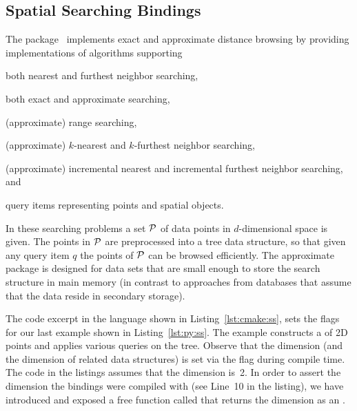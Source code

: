 \subsection{Spatial Searching Bindings}
\label{ssec:modules:ss}
The \dDSpatialSearchingPackage{} package~\cite{cgal:tf-ssd-21a}
implements exact and approximate distance browsing by providing
implementations of algorithms supporting
\begin{compactenum}
\item both nearest and furthest neighbor searching,
\item both exact and approximate searching,
\item (approximate) range searching,
\item (approximate) $k$-nearest and $k$-furthest neighbor searching,
\item (approximate) incremental nearest and incremental furthest neighbor searching, and
\item query items representing points and spatial objects.
\end{compactenum}
In these searching problems a set ${\cal P}$ of data points in
$d$-dimensional space is given. The points in ${\cal P}$ are preprocessed
into a tree data structure, so that given any query item $q$ the
points of ${\cal P}$ can be browsed efficiently. The approximate
\dDSpatialSearchingPackage{} package is designed for data sets that
are small enough to store the search structure in main memory (in
contrast to approaches from databases that assume that the data reside
in secondary storage).

\begin{table}[!htp]
  \caption{\dDSpatialSearchingPackage{} module flags}
  \centering{}
 \label{tab:ss}
\end{table}

The code excerpt in the \cmake{} language shown in
Listing~\ref{lst:cmake:ss}, sets the \cmake{} flags for our last
example shown in Listing~\ref{lst:py:ss}. The example constructs a
\kdtree{} of 2D points and applies various queries on the tree.
Observe that the \kdtree{} dimension (and the dimension of related
data structures) is set via the \cmake{} flag
 during compile time.
The code in the listings assumes that the dimension is~2. In order to
assert the dimension the bindings were compiled with (see Line~10 in
the listing), we have introduced and exposed a free function called
 that returns the
dimension as an .

